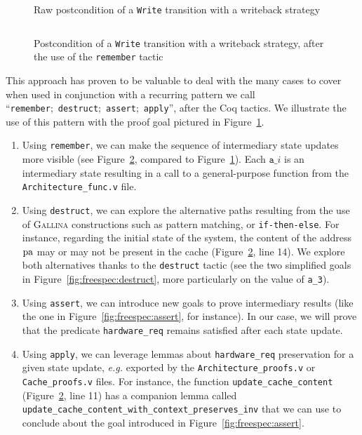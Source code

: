 \begin{figure}
  \inputminted{coq}{Listings/StateHell.v}

  \caption{Raw postcondition of a \texttt{Write} transition with a writeback
    strategy}
  \label{fig:freespec:entrypoint}
\end{figure}

\begin{figure}
  \inputminted{coq}{Listings/RememberPattern.v}

  \caption{Postcondition of a \texttt{Write} transition with a writeback
    strategy, after the use of the \texttt{remember} tactic}
  \label{fig:freespec:remember}
\end{figure}

This approach has proven to be valuable to deal with the many cases to cover
when used in conjunction with a recurring pattern we call
``\texttt{remember};~\texttt{destruct};~\texttt{assert};~\texttt{apply}'', after
the Coq tactics.
%
We illustrate the use of this pattern with the proof goal pictured in
Figure~\ref{fig:freespec:entrypoint}.
%
\begin{enumerate}
\item Using \texttt{remember}, we can make the sequence of intermediary state
  updates more visible (see Figure~\ref{fig:freespec:remember}, compared to
  Figure~\ref{fig:freespec:entrypoint}).
  Each \( \mathtt{a\_}i \) is an intermediary state resulting in a call to a
  general-purpose function from the \texttt{Architecture\_func.v} file.
\item Using \texttt{destruct}, we can explore the alternative paths resulting
  from the use of {\scshape Gallina} constructions such as pattern matching, or
  \texttt{if-then-else}.
  For instance, regarding the initial state of the system, the content of the
  address \( \mathrm{pa} \) may or may not be present in the cache
  (Figure~\ref{fig:freespec:remember}, line 14).
  We explore both alternatives thanks to the \texttt{destruct} tactic (see the
  two simplified goals in Figure~\ref{fig:freespec:destruct}, more particularly
  on the value of \texttt{a\_3}).
\item Using \texttt{assert}, we can introduce new goals to prove intermediary
  results (like the one in Figure~\ref{fig:freespec:assert}, for instance).
  In our case, we will prove that the predicate \texttt{hardware\_req} remains
  satisfied after each state update.
\item Using \texttt{apply}, we can leverage lemmas about \texttt{hardware\_req}
  preservation for a given state update, \emph{e.g.} exported by the
  \texttt{Architecture\_proofs.v} or \texttt{Cache\_proofs.v} files.
  For instance, the function \texttt{update\_cache\_content}
  (Figure~\ref{fig:freespec:remember}, line 11) has a companion lemma called
  \texttt{update\_cache\_content\-\_with\_context\_preserves\_inv} that we can
  use to conclude about the goal introduced in Figure~\ref{fig:freespec:assert}.
\end{enumerate}

